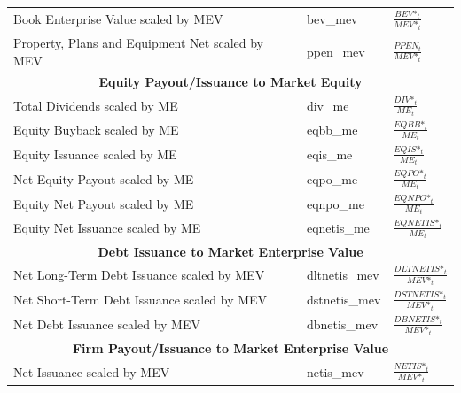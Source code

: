 \documentclass[12pt,title,fleqn]{article}
\begin{document}
{\begin{longtable}{@{\extracolsep{\fill}}|p{6cm}|l|p{8cm}|@{}}
    Book Enterprise Value scaled by MEV & bev\_mev &$\frac{BEV\mbox{*}_t}{MEV\mbox{*}_t}$ \\
	
    Property, Plans and Equipment Net scaled by MEV & ppen\_mev &$\frac{PPEN_t}{MEV\mbox{*}_t}$ \\
	
    \hline 
	\multicolumn{3}{|c|}{\textbf{Equity Payout/Issuance to Market Equity}} \\
	\hline 	

    Total Dividends scaled by ME & div\_me &$\frac{DIV\mbox{*}_t}{ME_t}$ \\
	
    Equity Buyback scaled by ME & eqbb\_me &$\frac{EQBB\mbox{*}_t}{ME_t}$ \\
	
    Equity Issuance scaled by ME & eqis\_me &$\frac{EQIS\mbox{*}_t}{ME_t}$ \\
	
    Net Equity Payout scaled by ME & eqpo\_me &$\frac{EQPO\mbox{*}_t}{ME_t}$\\
	
   Equity Net Payout scaled by ME & eqnpo\_me &$\frac{EQNPO\mbox{*}_t}{ME_t}$\\
	
    Equity Net Issuance scaled by ME & eqnetis\_me &$\frac{EQNETIS\mbox{*}_t}{ME_t}$ \\

    \hline 
	\multicolumn{3}{|c|}{\textbf{Debt Issuance to Market Enterprise Value}} \\
	\hline 
	
    Net Long-Term Debt Issuance scaled by MEV & dltnetis\_mev &$\frac{DLTNETIS\mbox{*}_t}{MEV\mbox{*}_t}$\\	
	
    Net Short-Term Debt Issuance scaled by MEV & dstnetis\_mev &$\frac{DSTNETIS\mbox{*}_t}{MEV\mbox{*}_t}$ \\
	
    Net Debt Issuance scaled by MEV & dbnetis\_mev &$\frac{DBNETIS\mbox{*}_t}{MEV\mbox{*}_t}$\\
	
    \hline 
	\multicolumn{3}{|c|}{\textbf{Firm Payout/Issuance to Market Enterprise Value}} \\
	\hline 	
	
    Net Issuance scaled by MEV & netis\_mev &$\frac{NETIS\mbox{*}_t}{MEV\mbox{*}_t}$ \\
	

\end{longtable}}
\end{document}
